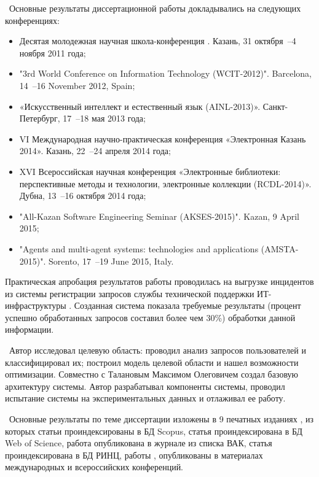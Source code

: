 \probation\
 Основные результаты диссертационной работы докладывались на следующих конференциях:
\begin{itemize}
	\item Десятая молодежная научная школа-конференция . Казань, 31 октября~--4 ноября 2011 года;
	\item "3rd World Conference on Information Technology (WCIT-2012)". Barcelona, 14~--16 November 2012, Spain; 
	\item «Искусственный интеллект и естественный язык (AINL-2013)». Санкт-Петербург, 17~--18 мая 2013 года;
	\item VI Международная научно-практическая конференция «Электронная Казань 2014». Казань, 22~--24 апреля 2014 года;
	\item XVI Всероссийская научная конференция «Электронные библиотеки: перспективные методы и технологии, электронные коллекции (RCDL-2014)». Дубна, 13~--16 октября 2014 года;
	\item "All-Kazan Software Engineering Seminar (AKSES-2015)". Kazan, 9 April 2015;
	\item "Agents and multi-agent systems: technologies and applications (AMSTA-2015)". Sorento, 17~--19 June 2015, Italy.
\end{itemize} \par
Практическая апробация результатов работы проводилась на выгрузке инцидентов из системы регистрации запросов службы технической поддержки ИТ-инфраструктуры \icl. Созданная система показала требуемые результаты (процент успешно обработанных запросов составил более чем 30\%) обработки данной информации. \par
\contribution\ Автор исследовал целевую область: проводил анализ запросов пользователей и классифицировал их; построил модель целевой области и нашел возможности оптимизации. Совместно с Талановым Максимом Олеговичем создал базовую архитектуру системы. Автор разрабатывал компоненты системы, проводил испытание системы на экспериментальных данных и отлаживал ее работу. \par
\publications\ Основные результаты по теме диссертации изложены в 9 печатных изданиях  \cite{Lobachevskii, WCIT-2012, AINL-2013, ISGZ, IJSE-1, IJSE-2, RCDL-2014, AMSTA-2015, VAK-1}, из которых статьи \cite{RCDL-2014, AMSTA-2015} проиндексированы в БД Scopus, статья \cite{AMSTA-2015} проиндексирована в БД Web of Science, работа \cite{VAK-1} опубликована в журнале из списка ВАК, статья  \cite{ISGZ} проиндексирована в БД РИНЦ, работы \cite{Lobachevskii},\cite{WCIT-2012, AINL-2013, ISGZ} опубликованы в материалах международных и всероссийских конференций.



